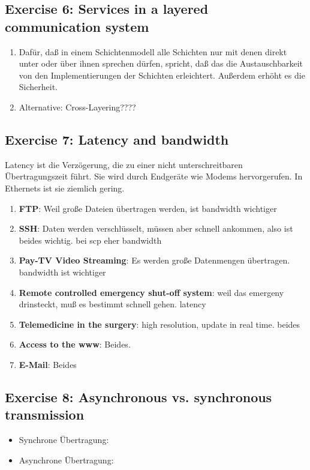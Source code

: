 \documentclass[10pt,a4paper]{scrartcl}
\begin{document}
\subsection*{Exercise 6: Services in a layered communication system}
\begin{enumerate}
\item Dafür, daß in einem Schichtenmodell alle Schichten nur mit denen direkt unter oder über ihnen sprechen dürfen, spricht, daß das die Austauschbarkeit von den Implementierungen der Schichten erleichtert. Außerdem erhöht es die Sicherheit.
\item Alternative: Cross-Layering????
\end{enumerate}

\subsection*{Exercise 7: Latency and bandwidth}
Latency ist die Verzögerung, die zu einer nicht unterschreitbaren Übertragungszeit führt. Sie wird durch Endgeräte wie Modems hervorgerufen. In Ethernets ist sie ziemlich gering.
\begin{enumerate}
\item \textbf{FTP}: Weil große Dateien übertragen werden, ist bandwidth wichtiger
\item \textbf{SSH}: Daten werden verschlüsselt, müssen aber schnell ankommen, also ist beides wichtig. bei scp eher bandwidth
\item \textbf{Pay-TV Video Streaming}: Es werden große Datenmengen übertragen. bandwidth ist wichtiger
\item \textbf{Remote controlled emergency shut-off system}: weil das emergeny drinsteckt, muß es bestimmt schnell gehen. latency
\item \textbf{Telemedicine in the surgery}: high resolution, update in real time. beides
\item \textbf{Access to the www}: Beides. 
\item \textbf{E-Mail}: Beides
\end{enumerate}

\subsection*{Exercise 8: Asynchronous vs. synchronous transmission}
\begin{itemize}
\item Synchrone Übertragung:
\item Asynchrone Übertragung:
\end{itemize}
\end{document}
